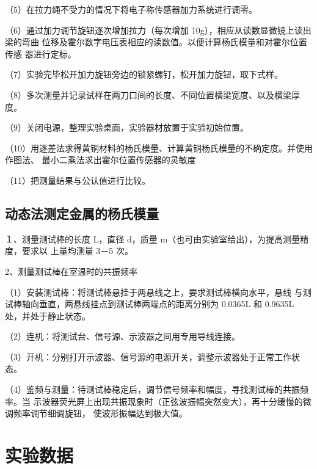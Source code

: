 \documentclass[12pt,a4paper]{article}
\begin{document}
（5）在拉力绳不受力的情况下将电子称传感器加力系统进行调零。

（6）通过加力调节旋钮逐次增加拉力（每次增加 10g），相应从读数显微镜上读出梁的弯曲
位移及霍尔数字电压表相应的读数值。以便计算杨氏模量和对霍尔位置传感
器进行定标。

（7）实验完毕松开加力旋钮旁边的锁紧螺钉，松开加力旋钮，取下式样。

（8）多次测量并记录试样在两刀口间的长度、不同位置横梁宽度、以及横梁厚度。

（9）关闭电源，整理实验桌面，实验器材放置于实验初始位置。

（10）用逐差法求得黄铜材料的杨氏模量、计算黄铜杨氏模量的不确定度。并使用作图法、
最小二乘法求出霍尔位置传感器的灵敏度

（11）把测量结果与公认值进行比较。
\subsection{动态法测定金属的杨氏模量}
１、测量测试棒的长度 L，直径 d，质量 m（也可由实验室给出），为提高测量精度，要求以
上量均测量 3－5 次。

2、测量测试棒在室温时的共振频率

（1）安装测试棒：将测试棒悬挂于两悬线之上，要求测试棒横向水平，悬线
与测试棒轴向垂直，两悬线挂点到测试棒两端点的距离分别为 0.0365L 和
0.9635L 处，并处于静止状态。

（2）连机：将测试台、信号源、示波器之间用专用导线连接。

（3）开机：分别打开示波器、信号源的电源开关，调整示波器处于正常工作状态。

（4）鉴频与测量：待测试棒稳定后，调节信号频率和幅度，寻找测试棒的共振频率。当
示波器荧光屏上出现共振现象时（正弦波振幅突然变大），再十分缓慢的微调频率调节细调旋钮，
使波形振幅达到极大值。

\section{实验数据}
\end{document}
